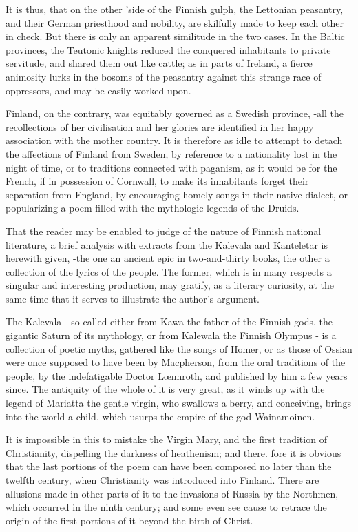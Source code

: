 \documentclass[10pt,a4paper]{article}
\begin{document}
It is thus, that on the other 'side of the Finnish gulph, the Lettonian peasantry, and their German priesthood and nobility, are skilfully made to keep each other in check. But there is only an apparent similitude in the two cases. In the Baltic provinces, the Teutonic knights reduced the conquered inhabitants to private servitude, and shared them out like cattle; as in parts of Ireland, a fierce animosity lurks in the bosoms of the peasantry against this strange race of oppressors, and may be easily worked upon.

Finland, on the contrary, was equitably governed as a Swedish province, -all the recollections of her civilisation and her glories are identified in her happy association with the mother country. It is therefore as idle to attempt to detach the affections of Finland from Sweden, by reference to a nationality lost in the night of time, or to traditions connected with paganism, as it would be for the French, if in possession of Cornwall, to make its inhabitants forget their separation from England, by encouraging homely songs in their native dialect, or popularizing a poem filled with the mythologic legends of the Druids.

That the reader may be enabled to judge of the nature of Finnish national literature, a brief analysis with extracts from the Kalevala and Kanteletar is herewith given, -the one an ancient epic in two-and-thirty books, the other a collection of the lyrics of the people. The former, which is in many respects a singular and interesting production, may gratify, as a literary curiosity, at the same time that it serves to illustrate the author's argument.

The Kalevala - so called either from Kawa the father of the Finnish gods, the gigantic Saturn of its mythology, or from Kalewala the Finnish Olympus - is a collection of poetic myths, gathered like the songs of Homer, or as those of Ossian were once supposed to have been by Macpherson, from the oral traditions of the people, by the indefatigable Doctor Lœnnroth, and published by him a few years since. The antiquity of the whole of it is very great, as it winds up with the legend of Mariatta the gentle virgin, who swallows a berry, and conceiving, brings into the world a child, which usurps the empire of the god Wainamoinen.

It is impossible in this to mistake the Virgin Mary, and the first tradition of Christianity, dispelling the darkness of heathenism; and there. fore it is obvious that the last portions of the poem can have been composed no later than the twelfth century, when Christianity was introduced into Finland. There are allusions made in other parts of it to the invasions of Russia by the Northmen, which occurred in the ninth century; and some even see cause to retrace the origin of the first portions of it beyond the birth of Christ.
\end{document}
